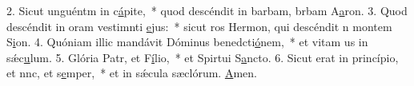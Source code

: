 2. Sicut unguéntm in c\uline{á}pite,~* quod descéndit in barbam, brbam A\uline{a}ron.
3. Quod descéndit in oram vestimnti \uline{e}jus:~* sicut ros Hermon, qui descéndit n montem S\uline{i}on.
4. Quóniam illic mandávit Dóminus benedcti\uline{ó}nem,~* et vitam us in sǽc\uline{u}lum.
5. Glória Patr, et F\uline{í}lio,~* et Spirtui S\uline{a}ncto.
6. Sicut erat in princípio, et nnc, et s\uline{e}mper,~* et in sǽcula sæclórum. \uline{A}men.
